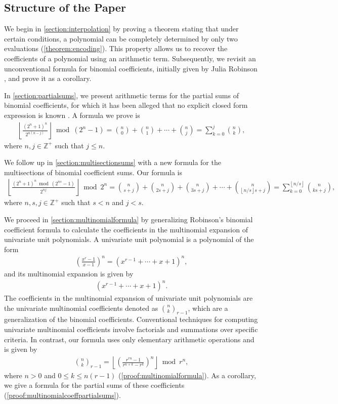 \documentclass[10pt,a4paper]{article}
\theoremstyle{plain}
\newcommand{\floor}[1]{\left\lfloor #1 \right\rfloor}
\newcommand{\Z}{\mathbb{Z}}
\begin{document}
\subsection{Structure of the Paper}
We begin in \cref{section:interpolation} by proving a theorem stating that under certain conditions, a polynomial can be completely determined by only two evaluations (\cref{theorem:encoding}). This property allows us to recover the coefficients of a polynomial using an arithmetic term. Subsequently, we revisit an unconventional formula for binomial coefficients, initially given by Julia Robinson \cite{robinson1952arithmetic}, and prove it as a corollary.

In \cref{section:partialsums}, we present arithmetic terms for the partial sums of binomial coefficients, for which it has been alleged that no explicit closed form expression is known \cite{boardman2004eggdropnumbers, wikipedia2024binomialcoefficient}. A formula we prove is
\begin{align*}
\floor{\frac{(2^n+1)^n}{2^{n(n-j)}}} \bmod (2^n-1)
= \binom{n}{0} + \binom{n}{1} + \cdots + \binom{n}{j}
= \sum_{k=0}^{j} \binom{n}{k} ,
\end{align*}
where $n,j \in \Z^+$ such that $j \leq n$.

We follow up in \cref{section:multisectionsums} with a new formula for the multisections of binomial coefficient sums. Our formula is
\begin{align*}
\floor{\frac{(2^n+1)^n \bmod(2^{ns}-1)}{2^{nj}}} \bmod 2^n
= \binom{n}{s+j} + \binom{n}{2s+j} + \binom{n}{3s+j} + \cdots + \binom{n}{\floor{n/s}s+j}
= \sum_{k=0}^{\floor{n/s}} \binom{n}{ks+j} ,
\end{align*}
where $n,s,j \in \Z^+$ such that $s < n$ and $j < s$.

We proceed in \cref{section:multinomialformula} by generalizing Robinson's binomial coefficient formula to calculate the coefficients in the multinomial expansion of univariate unit polynomials. A univariate unit polynomial is a polynomial of the form
\begin{align*}
    \left(\frac{x^{r}-1}{x-1}\right)^n = (x^{r-1} + \cdots + x + 1)^n  ,
\end{align*}
and its multinomial expansion is given by
\begin{align*}
 [x^k](x^{r-1} + \cdots + x + 1)^n .
\end{align*}
The coefficients in the multinomial expansion of univariate unit polynomials are the univariate multinomial coefficients denoted as $\binom{n}{k}_{r-1}$, which are a generalization of the binomial coefficients. Conventional techniques for computing univariate multinomial coefficients involve factorials and summations over specific criteria. In contrast, our formula uses only elementary arithmetic operations and is given by
\begin{align*}
    \binom{n}{k}_{r-1} = \left\lfloor\left(\frac{r^{rn} - 1}{r^{n+k} - r^k}\right)^n\right\rfloor \bmod r^n ,
\end{align*}
where $n > 0$ and $0 \leq k \leq n (r-1)$ (\cref{proof:multinomialformula}). As a corollary, we give a formula for the partial sums of these coefficients (\cref{proof:multinomialcoeffpartialsums}).
\end{document}
